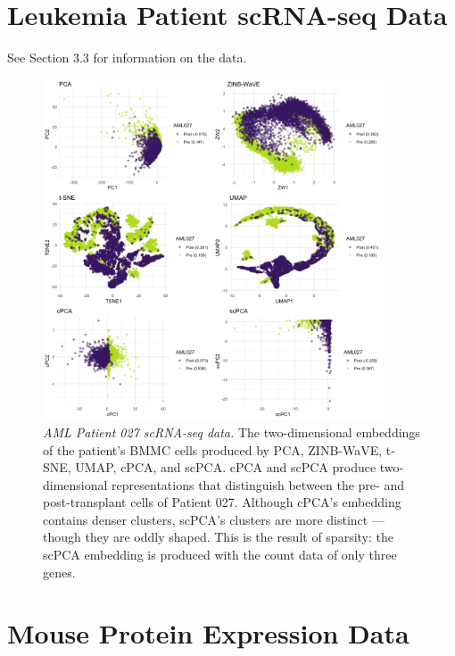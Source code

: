 \documentclass{article}
\begin{document}
\FloatBarrier

\newpage

\section{Leukemia Patient scRNA-seq Data}

See Section 3.3 %
for information on the data.

\begin{figure}[!htbp]
  \centering
  \includegraphics[width=0.9\textwidth]{figures/aml027_results}
  \caption{{\em AML Patient 027 scRNA-seq data.} The two-dimensional embeddings of the patient's BMMC cells produced by PCA, ZINB-WaVE, t-SNE, UMAP, cPCA, and scPCA. cPCA and scPCA produce two-dimensional representations that distinguish between the pre- and post-transplant cells of Patient 027. Although cPCA's embedding contains denser clusters, scPCA's clusters are more distinct --- though they are oddly shaped. This is the result of sparsity: the scPCA embedding is produced with the count data of only three genes.}
  \label{fig:comp_leuk_pat2}
\end{figure}
\FloatBarrier

\section{Mouse Protein Expression Data}\label{sup_mice}
\end{document}
